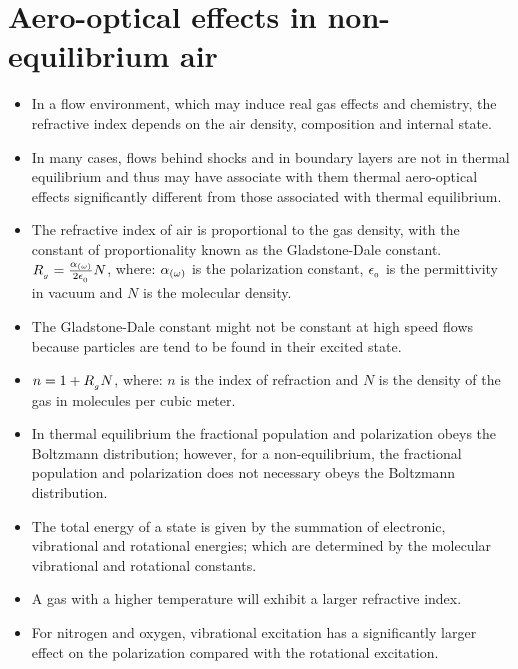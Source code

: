     \section{Aero-optical effects in non-equilibrium air \cite{tropina:plc:2018}}
        \begin{itemize}
            \item In a flow environment, which may induce real gas effects and chemistry, the refractive index depends on the air density, composition and internal state. 
            \item In many cases, flows behind shocks and in boundary layers are not in thermal equilibrium and thus may have associate with them thermal aero-optical effects significantly different from those associated with thermal equilibrium. 
            \item The refractive index of air is proportional to the gas density, with the constant of proportionality known as the Gladstone-Dale constant. $R_{_{g}} = \frac{\alpha_{\left(\omega\right)}}{2\epsilon_{_{0}}}N$, where: $\alpha_{\left(\omega\right)}$ is the polarization constant, $\epsilon_{_{0}}$ is the permittivity in vacuum and $N$ is the molecular density.
            \item The Gladstone-Dale constant might not be constant at high speed flows because particles are tend to be found in their excited state. 
            \item $n = 1 + R_{_{g}}N$, where: $n$ is the index of refraction and $N$ is the density of the gas in molecules per cubic meter.  
            \item In thermal equilibrium the fractional population and polarization obeys the Boltzmann distribution; however, for a non-equilibrium, the fractional population and polarization does not necessary obeys the Boltzmann distribution.  
            \item The total energy of a state is given by the summation of electronic, vibrational and rotational energies; which are determined by the molecular vibrational and rotational constants.
            \item A gas with a higher temperature will exhibit a larger refractive index. 
            \item For nitrogen and oxygen, vibrational excitation has a significantly larger effect on the polarization compared with the rotational excitation. 
        \end{itemize}


